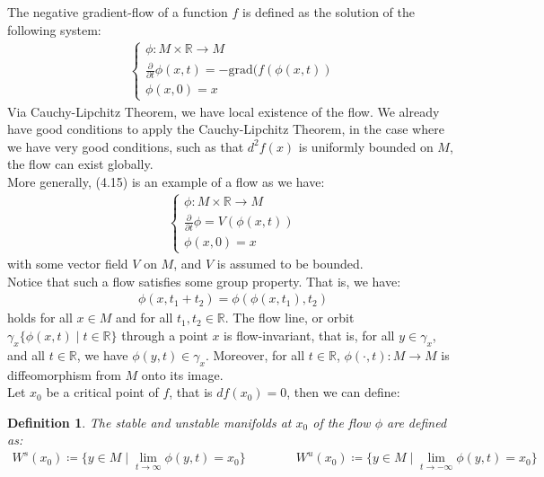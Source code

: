 \documentclass[11pt]{book}
\theoremstyle{break}
\theoremstyle{break}
\newtheorem{defn}{Definition}[corL]
\newcommand{\R}{\mathbb{R}}
\newcommand{\pd}{\partial}
\begin{document}
The negative gradient-flow of a function $f$ is defined as the solution of the following system:
\begin{align}
\begin{cases}
\phi:M \times \R \to M \\
\frac{\pd}{\pd t}\phi(x,t) = -\text{grad}(f(\phi(x,t))\\
\phi(x,0) = x
\end{cases}
\end{align}
Via Cauchy-Lipchitz Theorem, we have local existence of the flow. We already have good conditions to apply the Cauchy-Lipchitz Theorem, in the case where we have very good conditions, such as that $d^2f(x)$ is uniformly bounded on $M$, the flow can exist globally. \\

More generally, (4.15) is an example of a flow as we have:
\begin{align*}
\begin{cases}
\phi: M \times \R \to M\\
\frac{\pd}{\pd t}\phi = V(\phi(x,t))\\
\phi(x,0) = x
\end{cases}
\end{align*}
with some vector field $V$ on $M$, and $V$ is assumed to be bounded. \\

Notice that such a flow satisfies some group property. That is, we have:
\begin{align*}
\phi(x,t_1 + t_2) = \phi(\phi(x,t_1),t_2)
\end{align*}
holds for all $x \in M$ and for all $t_1,t_2 \in \R$. The flow line, or orbit $\gamma_x\{\phi(x,t) \mid t \in \R\}$ through a point $x$ is flow-invariant, that is, for all $y \in \gamma_x$, and all $t \in \R$, we have $\phi(y,t) \in \gamma_x$. Moreover, for all $t\in \R$, $\phi(\cdot, t) :M \to M$ is diffeomorphism from $M$ onto its image.\\

Let $x_0$ be a critical point of $f$, that is $df(x_0) = 0$, then we can define:
\begin{defn}
The stable and unstable manifolds at $x_0$ of the flow $\phi$ are defined as:
\begin{align*}
W^s(x_0) \coloneqq \{y \in M \mid \lim_{t\to \infty}\phi(y,t) = x_0 \} \qquad\qquad W^{u}(x_0)\coloneqq \{y \in M \mid \lim_{t\to -\infty}\phi(y,t) = x_0\}
\end{align*}
\end{defn}
\end{document}
